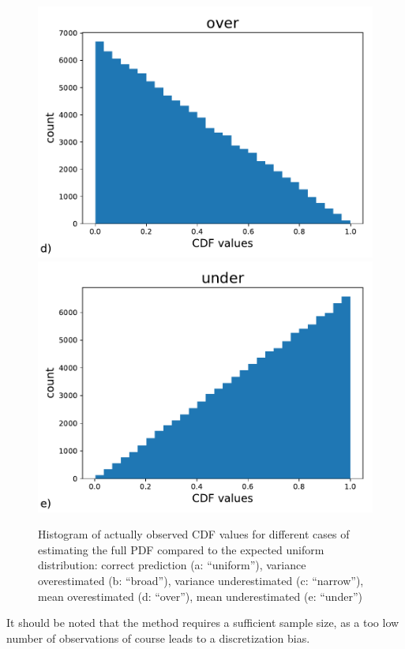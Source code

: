 \documentclass[BCOR=1mm, DIV=calc,10pt,
twoside=true,
twocolumn,
headings=normal]{scrartcl}
\begin{document}
\begin{figure}
\begin{center}
\includegraphics[scale=0.25]{../figures/cdf_truth_over}
\includegraphics[scale=0.25]{../figures/cdf_truth_under}
\caption{\label{fig:cdf_histos} Histogram of actually observed CDF values for different cases of estimating the full PDF compared to the expected uniform distribution:
correct prediction (a: ``uniform''), variance overestimated (b: ``broad''), variance underestimated (c: ``narrow''), mean overestimated (d: ``over''), mean underestimated (e: ``under'')}
\end{center}
\end{figure}

\noindent
It should be noted that the method requires a sufficient sample size, as a too low number of observations of course leads to a discretization bias.
\end{document}
